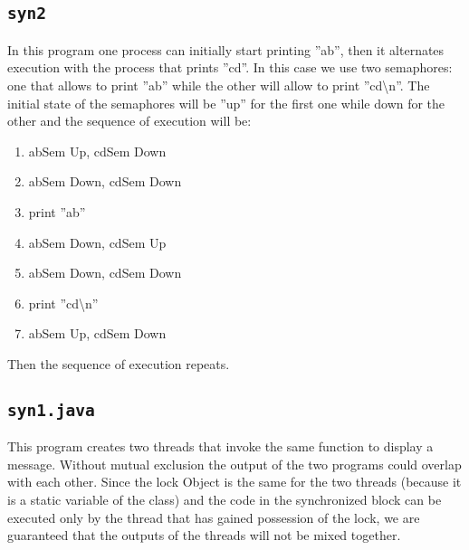 \subsection{\texttt{syn2}}
In this program one process can initially start printing ''ab'', then it alternates execution with the process that prints ''cd''. In this case we use two semaphores: one that allows to print ''ab'' while the other will allow to print ''cd\textbackslash{}n''. The initial state of the semaphores will be ''up'' for the first one while down for the other and the sequence of execution will be:
\begin{enumerate}
\item abSem Up, cdSem Down
\item abSem Down, cdSem Down
\item print ''ab''
\item abSem Down, cdSem Up
\item abSem Down, cdSem Down
\item print ''cd\textbackslash{}n''
\item abSem Up, cdSem Down
\end{enumerate}
Then the sequence of execution repeats.
\subsection{\texttt{syn1.java}}
This program creates two threads that invoke the same function to display a message. Without mutual exclusion the output of the two programs could overlap with each other. Since the lock Object is the same for the two threads (because it is a static variable of the class) and the code in the synchronized block can be executed only by the thread that has gained possession of the lock, we are guaranteed that the outputs of the threads will not be mixed together.
